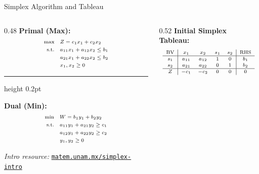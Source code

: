 \documentclass{beamer}
\begin{document}
\begin{frame}{Simplex Algorithm and Tableau}
\footnotesize

\begin{columns}[T]
  \begin{column}{0.48\textwidth}
    \textbf{Primal (Max):}
    \[
      \scriptsize
      \begin{aligned}
        \max \quad & Z = c_1 x_1 + c_2 x_2 \\
        \text{s.t.} \quad & a_{11}x_1 + a_{12}x_2 \leq b_1 \\
                          & a_{21}x_1 + a_{22}x_2 \leq b_2 \\
                          & x_1, x_2 \geq 0
      \end{aligned}
    \]

    \vspace{0.15cm}
    \hrule height 0.2pt
    \vspace{0.15cm}

    \textbf{Dual (Min):}
    \[
      \scriptsize
      \begin{aligned}
        \min \quad & W = b_1 y_1 + b_2 y_2 \\
        \text{s.t.} \quad & a_{11}y_1 + a_{21}y_2 \geq c_1 \\
                          & a_{12}y_1 + a_{22}y_2 \geq c_2 \\
                          & y_1, y_2 \geq 0
      \end{aligned}
    \]

    \vspace{0.2cm}
    {\scriptsize \textit{Intro resource: }
    \href{https://www.matem.unam.mx/~omar/math340/simplex-intro.html}{\texttt{matem.unam.mx/simplex-intro}}}
  \end{column}

  \begin{column}{0.52\textwidth}
    \textbf{Initial Simplex Tableau:}
    \[
      \scriptsize
      \renewcommand{\arraystretch}{1.1}
      \begin{array}{c|cccc|c}
        \text{BV} & x_1 & x_2 & s_1 & s_2 & \text{RHS} \\
        \hline
        s_1 & a_{11} & a_{12} & 1 & 0 & b_1 \\
        s_2 & a_{21} & a_{22} & 0 & 1 & b_2 \\
        \hline
        Z   & -c_1 & -c_2 & 0 & 0 & 0
      \end{array}
    \]


\end{column}
\end{columns}
\end{frame}
\end{document}
